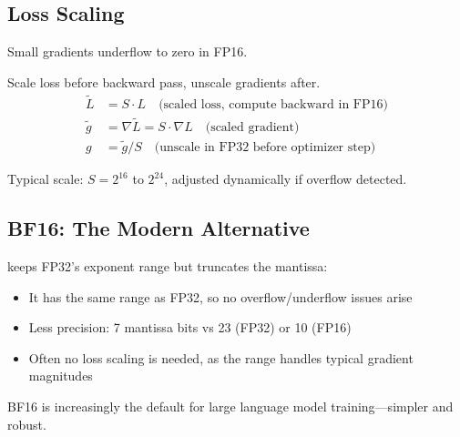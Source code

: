 

\subsection{Loss Scaling}

 Small gradients underflow to zero in FP16.

 Scale loss before backward pass, unscale gradients after.
\begin{align}
    \tilde{L} &= S \cdot L \quad \text{(scaled loss, compute backward in FP16)} \\
    \tilde{g} &= \nabla \tilde{L} = S \cdot \nabla L \quad \text{(scaled gradient)} \\
    g &= \tilde{g} / S \quad \text{(unscale in FP32 before optimizer step)}
\end{align}

Typical scale: $S = 2^{16}$ to $2^{24}$, adjusted dynamically if overflow detected.


\subsection{BF16: The Modern Alternative}

 keeps FP32's exponent range but truncates the mantissa:

\begin{itemize}
    \item It has the same range as FP32, so no overflow/underflow issues arise
    \item Less precision: 7 mantissa bits vs 23 (FP32) or 10 (FP16)
    \item Often no loss scaling is needed, as the range handles typical gradient magnitudes
\end{itemize}

BF16 is increasingly the default for large language model training---simpler and robust.





